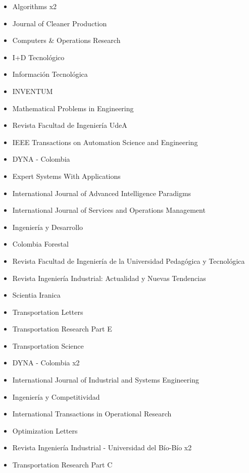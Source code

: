 {\begin{itemize}
\item Algorithms x2
\item Journal of Cleaner Production
\item Computers \& Operations Research
\item I+D Tecnol\'ogico
\item Informaci\'on Tecnol\'ogica
\item INVENTUM
\item Mathematical Problems in Engineering
\item Revista Facultad de Ingenier\'ia UdeA
\item IEEE Transactions on Automation Science and Engineering
\end{itemize}
}

{\begin{itemize}
\item DYNA - Colombia
\item Expert Systems With Applications
\item International Journal of Advanced Intelligence Paradigms 
\item International Journal of Services and Operations Management
\item Ingenier\'ia y Desarrollo 
\item Colombia Forestal
\item Revista Facultad de Ingenier\'ia de la Universidad Pedag\'ogica y Tecnol\'ogica
\item Revista Ingenier\'ia Industrial: Actualidad y Nuevas Tendencias
\item Scientia Iranica
\item Transportation Letters
\item Transportation Research Part E
\item Transportation Science
\end{itemize}
}

{\begin{itemize}
\item DYNA - Colombia x2
\item International Journal of Industrial and Systems Engineering
\item Ingenier\'ia y Competitividad
\item International Transactions in Operational Research
\item Optimization Letters
\item Revista Ingenier\'ia Industrial - Universidad del B\'io-B\'io x2
\item Transportation Research Part C
\end{itemize}
}

